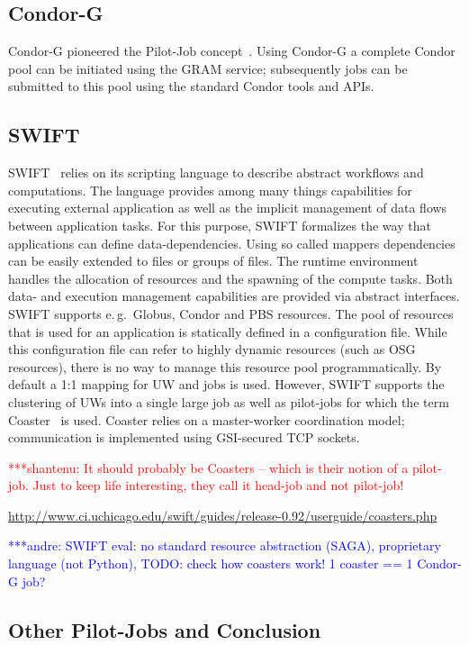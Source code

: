 \documentclass[conference,final]{IEEEtran}
\newcommand{\jhanote}[1]{ {\textcolor{red} { ***shantenu: #1 }}}
\newcommand{\alnote}[1]{ {\textcolor{blue} { ***andre: #1 }}}
\newcommand{\alnote}[1]{}
\newcommand{\jhanote}[1]{}
\begin{document}
\subsection{Condor-G}

Condor-G pioneered the Pilot-Job concept~\cite{condor-g}. Using Condor-G 
a complete Condor pool can be initiated using the GRAM service; subsequently 
jobs can be submitted to this pool using the standard Condor tools and APIs.

\subsection{SWIFT}

SWIFT~\cite{Wilde2011} relies on its scripting language to describe abstract
workflows and computations. The language provides among many things capabilities
for executing external application as well as the implicit management of data
flows between application tasks. For this purpose, SWIFT formalizes the way that
applications can define data-dependencies. Using so called mappers dependencies
can be easily extended to files or groups of files. The runtime environment
handles the allocation of resources and the spawning of the compute tasks. Both
data- and execution management capabilities are provided via abstract
interfaces. SWIFT supports e.\,g.\ Globus, Condor and PBS resources. The pool of
resources that is used for an application is statically defined in a
configuration file. While this configuration file can refer to highly dynamic
resources (such as OSG resources), there is no way to manage this resource pool
programmatically. By default a 1:1 mapping for UW and jobs is used. However,
SWIFT supports the clustering of UWs into a single large job as well as
pilot-jobs for which the term Coaster~\cite{coasters} is used. Coaster relies on
a master-worker coordination model; communication is implemented using
GSI-secured TCP sockets.

\jhanote{It should probably be Coasters -- which is their notion of a pilot-job. Just
to keep life interesting, they call it head-job and not pilot-job!}

\url{http://www.ci.uchicago.edu/swift/guides/release-0.92/userguide/coasters.php}


\alnote{SWIFT eval: no standard resource abstraction (SAGA), proprietary 
language (not Python), TODO: check how coasters work! 1 coaster == 1 Condor-G 
job?}


\subsection{Other Pilot-Jobs and Conclusion}
\end{document}
